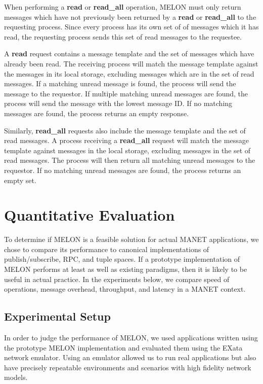 \documentclass[lnicst]{svmultln}
\begin{document}
When performing a \textbf{read} or \textbf{read\_all} operation, MELON must only return messages which have not previously been returned by a \textbf{read} or \textbf{read\_all} to the requesting process. Since every process has its own set of of messages which it has read, the requesting process sends this set of read messages to the requestee.

A \textbf{read} request contains a message template and the set of messages which have already been read. The receiving process will match the message template against the messages in its local storage, excluding messages which are in the set of read messages. If a matching unread message is found, the process will send the message to the requestor. If multiple matching unread messages are found, the process will send the message with the lowest message ID. If no matching messages are found, the process returns an empty response.

Similarly, \textbf{read\_all} requests also include the message template and the set of read messages. A process receiving a \textbf{read\_all} request will match the message template against messages in the local storage, excluding messages in the set of read messages. The process will then return all matching unread messages to the requestor. If no matching unread messages are found, the process returns an empty set.

\section{Quantitative Evaluation}\label{sec:evaluation}

To determine if MELON is a feasible solution for actual MANET applications, we chose to compare its performance to canonical implementations of publish/subscribe, RPC, and tuple spaces. If a prototype implementation of MELON performs at least as well as existing paradigms, then it is likely to be useful in actual practice. In the experiments below, we compare speed of operations, message overhead, throughput, and latency in a MANET context.

\subsection{Experimental Setup}

In order to judge the performance of MELON, we used applications written using the prototype MELON implementation and evaluated them using the EXata network emulator\cite{exata}. Using an emulator allowed us to run real applications but also have precisely repeatable environments and scenarios with high fidelity network models.
\end{document}
